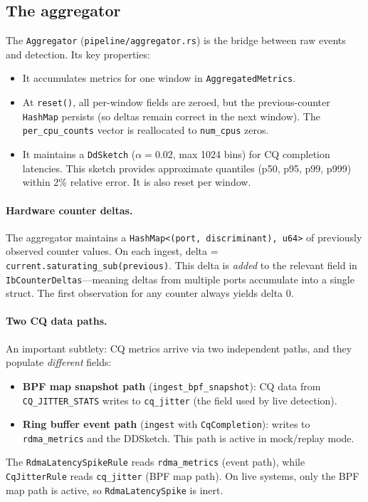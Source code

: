 \documentclass[11pt]{article}
\begin{document}
\subsection{The aggregator}

The \texttt{Aggregator} (\texttt{pipeline/aggregator.rs}) is the bridge
between raw events and detection. Its key properties:

\begin{itemize}[nosep]
  \item It accumulates metrics for one window in \texttt{AggregatedMetrics}.
  \item At \texttt{reset()}, all per-window fields are zeroed, but the
        previous-counter \texttt{HashMap} persists (so deltas remain correct
        in the next window). The \texttt{per\_cpu\_counts} vector is
        reallocated to \texttt{num\_cpus} zeros.
  \item It maintains a \texttt{DdSketch} ($\alpha = 0.02$, max 1024 bins)
        for CQ completion latencies. This sketch provides approximate
        quantiles (p50, p95, p99, p999) within 2\% relative error. It is
        also reset per window.
\end{itemize}

\paragraph{Hardware counter deltas.}
The aggregator maintains a \texttt{HashMap<(port, discriminant), u64>} of
previously observed counter values. On each ingest, delta =
\texttt{current.saturating\_sub(previous)}. This delta is \emph{added} to
the relevant field in \texttt{IbCounterDeltas}---meaning deltas from
multiple ports accumulate into a single struct. The first observation for
any counter always yields delta 0.

\paragraph{Two CQ data paths.}
An important subtlety: CQ metrics arrive via two independent paths, and
they populate \emph{different} fields:
\begin{itemize}[nosep]
  \item \textbf{BPF map snapshot path} (\texttt{ingest\_bpf\_snapshot}):
        CQ data from \texttt{CQ\_JITTER\_STATS} writes to
        \texttt{cq\_jitter} (the field used by live detection).
  \item \textbf{Ring buffer event path} (\texttt{ingest} with
        \texttt{CqCompletion}): writes to \texttt{rdma\_metrics} and the
        DDSketch. This path is active in mock/replay mode.
\end{itemize}
The \texttt{RdmaLatencySpikeRule} reads \texttt{rdma\_metrics} (event path),
while \texttt{CqJitterRule} reads \texttt{cq\_jitter} (BPF map path). On
live systems, only the BPF map path is active, so
\texttt{RdmaLatencySpike} is inert.
\end{document}
